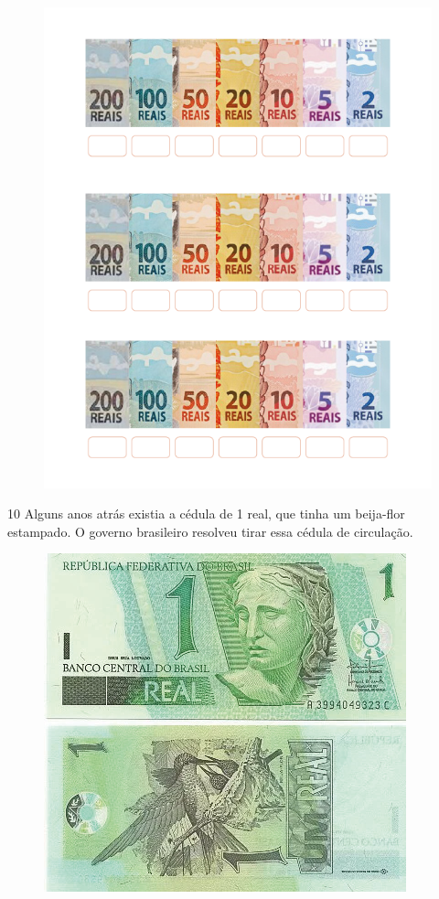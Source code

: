 \begin{figure}[htpb!]
\includegraphics[width=.9\textwidth]{./media/image70.png}
\end{figure}



\pagebreak

\num{10} Alguns anos atrás existia a cédula de 1 real, que tinha um beija-flor
estampado. O governo brasileiro resolveu tirar essa cédula de circulação.


\begin{figure}[htpb!]
\centering
\includegraphics[width=.3\textwidth]{./media/image64.png}
\end{figure}

